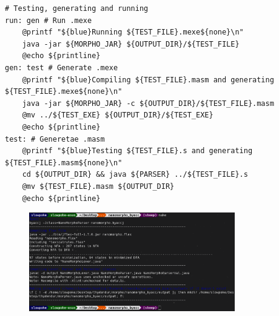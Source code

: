 \documentclass{homework}
\begin{document}
\begin{answer}
\begin{verbatim}
# Testing, generating and running
run: gen # Run .mexe
	@printf "${blue}Running ${TEST_FILE}.mexe${none}\n"
	java -jar ${MORPHO_JAR} ${OUTPUT_DIR}/${TEST_FILE}
	@echo ${printline}
gen: test # Generate .mexe
	@printf "${blue}Compiling ${TEST_FILE}.masm and generating ${TEST_FILE}.mexe${none}\n"
	java -jar ${MORPHO_JAR} -c ${OUTPUT_DIR}/${TEST_FILE}.masm
	@mv ../${TEST_EXE} ${OUTPUT_DIR}/${TEST_EXE}
	@echo ${printline}
test: # Generetae .masm
	@printf "${blue}Testing ${TEST_FILE}.s and generating ${TEST_FILE}.masm${none}\n"
	cd ${OUTPUT_DIR} && java ${PARSER} ../${TEST_FILE}.s
	@mv ${TEST_FILE}.masm ${OUTPUT_DIR}
	@echo ${printline}
  \end{verbatim}
  \begin{figure}[H]
    \centering
    \includegraphics[width=0.8\textwidth]{make.png}
  \end{figure}
\end{answer}
\end{document}
